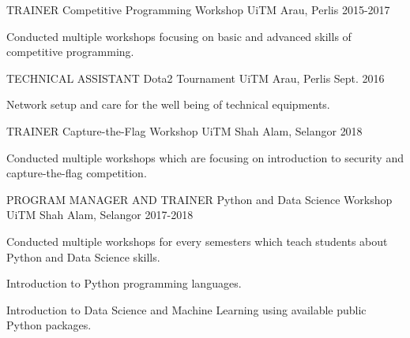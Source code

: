 

\begin{cventries}

  \cventry
    {TRAINER}
    {Competitive Programming Workshop}
    {UiTM Arau, Perlis}
    {2015-2017}
    {
      \begin{cvitems}
        \item {Conducted multiple workshops focusing on basic and advanced skills of competitive programming.}
      \end{cvitems}
    }

  \cventry
    {TECHNICAL ASSISTANT}
    {Dota2 Tournament}
    {UiTM Arau, Perlis}
    {Sept. 2016}
    {
      \begin{cvitems}
        \item {Network setup and care for the well being of technical equipments.}
      \end{cvitems}
    }

  \cventry
    {TRAINER}
    {Capture-the-Flag Workshop}
    {UiTM Shah Alam, Selangor}
    {2018}
    {
      \begin{cvitems}
        \item {Conducted multiple workshops which are focusing on introduction to security and capture-the-flag competition.}
      \end{cvitems}
    }

  \cventry
    {PROGRAM MANAGER AND TRAINER}
    {Python and Data Science Workshop}
    {UiTM Shah Alam, Selangor}
    {2017-2018}
    {
      \begin{cvitems}
        \item {Conducted multiple workshops for every semesters which teach students about Python and Data Science skills.}
        \item {Introduction to Python programming languages.}
        \item {Introduction to Data Science and Machine Learning using available public Python packages.}
      \end{cvitems}
    }


\end{cventries}
